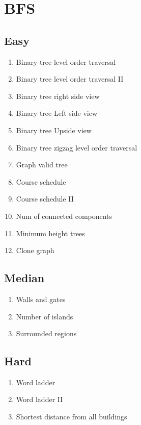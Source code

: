 \documentclass[DIV=calc, paper=a4, fontsize=11pt, twocolumn]{scrartcl}	 %
\begin{document}

\section*{BFS}

\subsection*{Easy}
\begin{enumerate}
\item Binary tree level order traversal \cite{102}
\item Binary tree level order traversal II \cite{107}
\item Binary tree right side view \cite{199}
\item Binary tree Left side view
\item Binary tree Upside view
\item Binary tree zigzag level order traversal \cite{103}
\item Graph valid tree \cite{261}
\item Course schedule \cite{207}
\item Course schedule II \cite{210}
\item Num of connected components \cite{323}
\item Minimum height trees \cite{310}
\item Clone graph \cite{133}
\end{enumerate}

\subsection*{Median}
\begin{enumerate}
\item Walls and gates \cite{286}
\item Number of islands \cite{200}
\item Surrounded regions \cite{130}
\end{enumerate}

\subsection*{Hard}
\begin{enumerate}
\item Word ladder \cite{127} 
\item Word ladder II \cite{126}
\item Shortest distance from all buildings
\end{enumerate}
\end{document}
